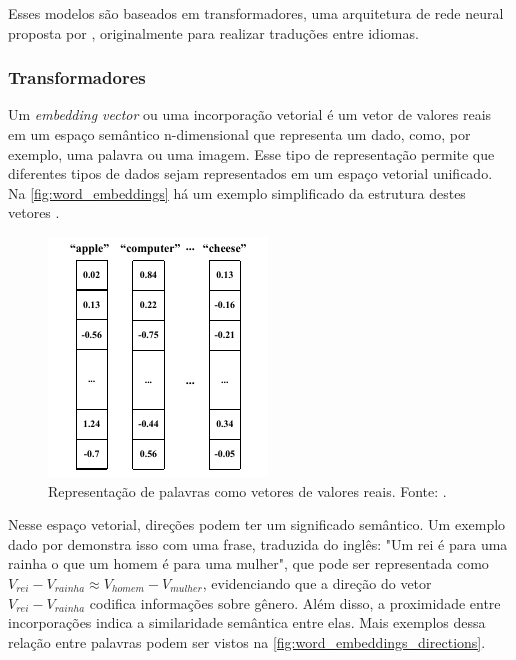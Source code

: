 Esses modelos são baseados em transformadores, uma arquitetura de rede neural proposta por \textcite{transformers_the_og}, originalmente para realizar traduções entre
idiomas.

\subsubsection{Transformadores}


Um \textit{embedding vector} ou uma incorporação vetorial é um vetor de valores reais em um espaço semântico n-dimensional que representa um dado, como, por exemplo, uma
palavra ou uma imagem. Esse tipo de representação permite que diferentes tipos de dados sejam representados em um espaço vetorial unificado. Na
\autoref{fig:word_embeddings} há um exemplo simplificado da estrutura destes vetores \cite{word_embedding, mllm_survey_2023}.

\begin{figure}[ht]
      \centering
      \includegraphics[width=0.4\columnwidth,keepaspectratio]{images/word_embeddings.pdf}
      \caption{\small Representação de palavras como vetores de valores reais. Fonte: \textcite{word_embedding}.}
      \label{fig:word_embeddings}
\end{figure}

Nesse espaço vetorial, direções podem ter um significado semântico. Um exemplo dado por \textcite{glove} demonstra isso com uma frase, traduzida do inglês: "Um rei é para
uma rainha o que um homem é para uma mulher", que pode ser representada como \textit{$V_{rei} - V_{rainha} \approx V_{homem} - V_{mulher}$}, evidenciando que a direção do
vetor \textit{$V_{rei} - V_{rainha}$} codifica informações sobre gênero. Além disso, a proximidade entre incorporações indica a similaridade semântica entre elas. Mais
exemplos dessa relação entre palavras podem ser vistos na \autoref{fig:word_embeddings_directions}.

